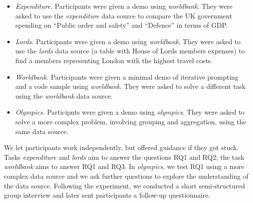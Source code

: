 \documentclass[manuscript,review,anonymous]{acmart}
\begin{document}
\begin{itemize}
\item \emph{Expenditure.} Participants were given a demo using \emph{worldbank}.
  They were asked to use the \emph{expenditure} data source to compare the UK government spending
  on ``Public order and safety'' and ``Defence'' in terms of GDP.
\item \emph{Lords.} Participants were given a demo using \emph{worldbank}.
  They were asked to use the \emph{lords} data source (a table with House of Lords
  members expenses) to find a members representing London with the highest travel costs.
\item \emph{Worldbank.} Participants were given a minimal demo of iterative prompting and
  a code sample using \emph{worldbank}. They were asked to solve a different task using
  the \emph{worldbank} data source.
\item \emph{Olympics.} Participnts were given a demo using \emph{olympics}.
  They were asked to solve a more complex problem, involving grouping and aggregation,
  using the same data source.
\end{itemize}

\noindent
We let participants work independently, but offered guidance if they got stuck.
Tasks \emph{expenditure} and \emph{lords} aim to answer the questions RQ1 and RQ2; the task
\emph{worldbank} aims to answer RQ1 and RQ3. In \emph{olympics}, we test RQ1 using a more complex
data source and we ask further questions to explore the understanding of the data source. Following the
experiment, we conducted a short semi-structured group interview and later sent participants a follow-up
questionnaire.
\end{document}
